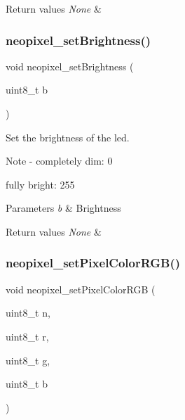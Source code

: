 \begin{DoxyRetVals}{Return values}
{\em None} & \\
\hline
\end{DoxyRetVals}
\mbox{\label{group__neopixel_gae027558106eef5c81996294f4561fecb}} 
\subsubsection{\texorpdfstring{neopixel\+\_\+set\+Brightness()}{neopixel\_setBrightness()}}
{\footnotesize\ttfamily void neopixel\+\_\+set\+Brightness (\begin{DoxyParamCaption}\item[{uint8\+\_\+t}]{b }\end{DoxyParamCaption})}



Set the brightness of the led. 

\begin{DoxyNote}{Note}
-\/ completely dim\+: 0
\begin{DoxyItemize}
\item fully bright\+: 255 
\end{DoxyItemize}
\end{DoxyNote}

\begin{DoxyParams}{Parameters}
{\em b} & Brightness \\
\hline
\end{DoxyParams}

\begin{DoxyRetVals}{Return values}
{\em None} & \\
\hline
\end{DoxyRetVals}
\mbox{\label{group__neopixel_gadbf8ae449ade0b6015cb75632182b04c}} 
\subsubsection{\texorpdfstring{neopixel\+\_\+set\+Pixel\+Color\+R\+G\+B()}{neopixel\_setPixelColorRGB()}}
{\footnotesize\ttfamily void neopixel\+\_\+set\+Pixel\+Color\+R\+GB (\begin{DoxyParamCaption}\item[{uint8\+\_\+t}]{n,  }\item[{uint8\+\_\+t}]{r,  }\item[{uint8\+\_\+t}]{g,  }\item[{uint8\+\_\+t}]{b }\end{DoxyParamCaption})}



